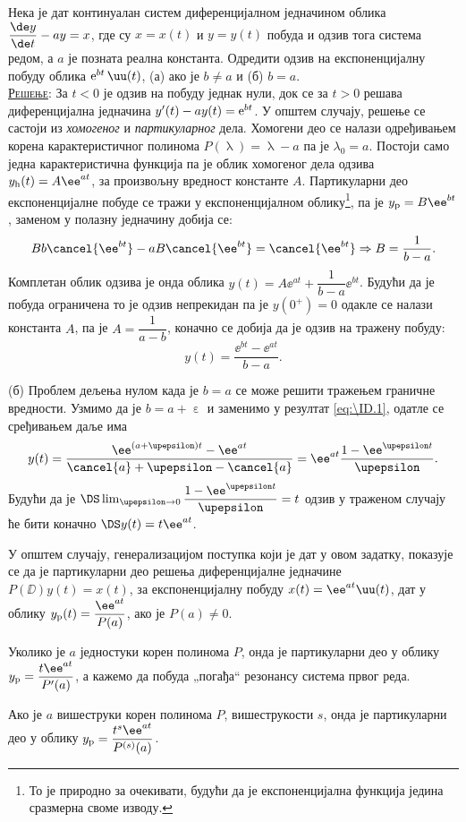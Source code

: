 \PID Нека је дат континуалан систем диференцијалном једначином облика 
${\dfrac{\de y}{\de t} - ay = x}$, где су $x=x(t)$ и $y=y(t)$ побуда и одзив тога система редом, а $a$ је позната
реална константа. Одредити одзив на експоненцијалну побуду облика 
${\rm e}^{bt} \, \uu(t)$, (а) ако је $b \neq a$ и (б) $b = a$. \\[5mm]

\textsc{\underline{Решење}}: За $t < 0$ је одзив на побуду једнак нули, док се 
за $t > 0$ решава диференцијална једначина 
${y'(t) - ay(t)  = {\rm e}^{bt}}$. У општем случају, решење се састоји из 
\textit{хомогеног} и \textit{партикуларног} дела. Хомогени део се налази одређивањем корена 
карактеристичног полинома $P(\uplambda) = \uplambda - a$ па је $\lambda_0 = a$. Постоји само 
једна карактеристична функција па је облик хомогеног дела одзива 
$y_{\rm h}(t) = A \ee^{at}$, за произвољну вредност константе $A$. Партикуларни део експоненцијалне побуде се тражи у 
експоненцијалном облику\footnote{То је природно за очекивати, будући да је експоненцијална функција
једина сразмерна своме изводу.}, па је $y_{\rm p} = B\ee^{bt}$, заменом у полазну једначину добија се:
\begin{equation}
    Bb\cancel{\ee^{bt}} - aB\cancel{\ee^{bt}} = \cancel{\ee^{bt}} \Rightarrow
    B = \dfrac{1}{b - a}.
\end{equation}
Комплетан облик одзива је онда облика $y(t) = A\ee^{at} + \dfrac{1}{b-a} \ee^{bt}$. Будући да је
побуда ограничена то је одзив непрекидан па је $y(0^+) = 0$ одакле се налази константа $A$, 
па је $A = \dfrac{1}{a - b}$, коначно се добија да је одзив на тражену побуду:
\begin{equation}
    y(t) = \dfrac{\ee^{bt} - \ee^{at}}{b - a}.
    \label{eq:\ID.1}
\end{equation}

(б) 
Проблем дељења нулом када је $b=a$ се може решити тражењем граничне вредности. 
Узмимо да је $b = a + \upepsilon$ 
и заменимо у резултат \ref{eq:\ID.1}, одатле се сређивањем даље има
\begin{equation}
    y(t) = \dfrac{\ee^{(a + \upepsilon)t} - \ee^{at}}{\cancel{a} + \upepsilon - \cancel{a}} = 
    \ee^{at} \dfrac{1 -\ee^{\upepsilon t}}{\upepsilon}.
\end{equation}
Будући да је $\DS \lim_{\upepsilon\to 0} \dfrac{1 -\ee^{\upepsilon t}}{\upepsilon} = t$ одзив
у траженом случају ће бити коначно 
$\DS y(t) = t \ee^{at}$.

У општем случају, генерализацијом поступка који је дат у овом задатку, показује 
се да је партикуларни део решења диференцијалне једначине 
$P(\DD) y(t) = x(t)$, за експоненцијалну побуду $x(t) = \ee^{at} \uu(t)$, дат 
у облику $y_{\rm p}(t) = \dfrac{\ee^{at}}{P(a)}$, ако је $P(a) \neq 0$.

Уколико је $a$ једностуки корен полинома $P$, онда је партикуларни део у облику
$y_{\rm p} = \dfrac{t \ee^{at}}{P'(a)}$, а кажемо да побуда „погађа“ резонансу система 
првог реда. 

Ако је $a$ вишеструки корен полинома $P$, вишеструкости $s$, 
онда је партикуларни део у облику $ y_{\rm p} = \dfrac{t^s \ee^{at}}{P^{(s)}(a)}$.